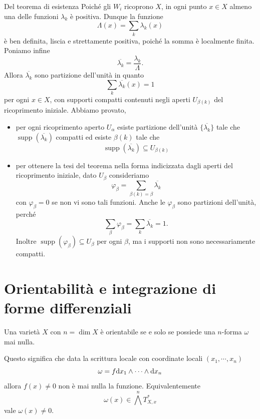 \documentclass[a4paper]{article}
\begin{document}
\begin{snippetproof}{Del teorema di esistenza}
    Poiché gli \(W_i\) ricoprono \(X\), in ogni punto \(x \in X\)
    almeno una delle funzioni \(\lambda_k\) è positiva.
    Dunque la funzione \[
        \Lambda(x) = \sum_k \lambda_k(x)
    \]
    è ben definita, liscia e strettamente positiva, poiché la somma è
    localmente finita. Poniamo infine \[
        \overline {\lambda_k} = \frac{\lambda_k}{\Lambda}.
    \]
    Allora \(\overline{\lambda_k}\) sono partizione dell'unità
    in quanto \[
        \sum_k \overline{\lambda_k}(x) = 1
    \]
    per ogni \(x \in X\), con supporti compatti contenuti
    negli aperti \(U_{\beta(k)}\) del ricoprimento iniziale.
    Abbiamo provato,
    \begin{itemize}
        \item per ogni ricoprimento aperto \(U_\alpha\) esiste partizione dell'unità
        \(\{\overline {\lambda_k}\}\) tale che
        \(\operatorname{supp}(\overline {\lambda_k})\) compatti ed esiste \(\beta(k)\)
        tale che \[
            \operatorname{supp}(\overline {\lambda_k})
            \subseteq U_{\beta(k)}
        \]
        \item per ottenere la tesi del teorema nella forma indicizzata
        dagli aperti del ricoprimento iniziale, dato \(U_\beta\) consideriamo \[
            \varphi_\beta = \sum_{\beta(k)=\beta} \overline{\lambda_k}
        \]
        con \(\varphi_\beta = 0\) se non vi sono tali funzioni.
        Anche le \(\varphi_\beta\) sono partizioni dell'unità,
        perché \[
            \sum_\beta \varphi_\beta
            =
            \sum_k \overline{\lambda_k}
            =
            1.
        \]
        Inoltre \(\operatorname{supp}(\varphi_\beta) \subseteq U_\beta\)
        per ogni \(\beta\), ma i supporti non sono necessariamente compatti.
    \end{itemize}
\end{snippetproof}

\pagebreak

\section{Orientabilità e integrazione di forme differenziali}

\begin{snippettheorem}{}
    Una varietà \(X\) con \(n = \dim X\) è orientabile
    se e solo se possiede una \(n\)-forma \(\omega\) mai nulla.
\end{snippettheorem}

Questo significa che data la scrittura locale con coordinate locali \((x_1, \cdots, x_n)\)
\[
    \omega = f\text dx_1 \wedge \cdots \wedge \text dx_n
\]
allora \(f(x) \neq 0\) non è mai nulla la funzione.
Equivalentemente
\[
    \omega(x) \in \bigwedge^n T_{X,x}^\ast
\] vale \(\omega(x) \neq 0\).
\end{document}
